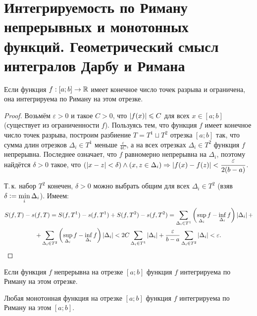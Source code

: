 \section{Интегрируемость по Риману непрерывных и монотонных функций. Геометрический смысл интегралов Дарбу и Римана}

\begin{statement}
    Если функция $f: [a; b] \to \mathbb{R}$ имеет конечное число точек разрыва и ограничена, она интегрируема по Риману на этом отрезке.
\end{statement}

\begin{proof}
    Возьмём $\varepsilon > 0$ и такое $C > 0$, что $\left\lvert f(x)\right\rvert \leqslant C$ для всех $x \in [a; b]$ (существует из ограниченности $f$). Пользуясь тем, что функция $f$ имеет конечное число точек разрыва, построим разбиение $T = T^1 \sqcup T^2$ отрезка $[a; b]$ так, что сумма длин отрезков $\Delta_i \in T^1$ меньше $\frac{\varepsilon}{4C}$, а на всех отрезках $\Delta_i \in T^2$ функция $f$ непрерывна. Последнее означает, что $f$ равномерно непрерывна на $\Delta_i$, поэтому найдётся $\delta > 0$ такое, что $\displaystyle\left(\left\lvert x - z\right\rvert < \delta\right) \wedge \left(x, z \in \Delta_i\right) \Rightarrow \left\lvert f(x) - f(z)\right\rvert < \frac{\varepsilon}{2(b - a)}$.

    Т.\,к. набор $T^2$ конечен, $\delta > 0$ можно выбрать общим для всех $\Delta_i \in T^2$ (взяв $\delta \vcentcolon = \min\limits_{i}\Delta_i$). Имеем:
    \begin{multline*}
        S(f, T) - s(f, T) = S(f, T^1) - s(f, T^1) + S(f, T^2) - s(f, T^2) = \sum_{\Delta_i \in T^1}\left(\sup_{\Delta_i}f - \inf\limits_{\Delta_i}f\right)\left\lvert\Delta_i\right\rvert +\\ + \sum_{\Delta_i \in T^2}\left(\sup_{\Delta_i}f - \inf_{\Delta_i}f\right)\left\lvert\Delta_i\right\rvert < 2C\sum_{\Delta_i \in T^1}\left\lvert\Delta_i\right\rvert + \frac{\varepsilon}{b - a}\sum_{\Delta_i \in T^2}\left\lvert\Delta_i\right\rvert < \varepsilon.
    \end{multline*}
\end{proof}

\begin{corollary}
    Если функция $f$ непрерывна на отрезке $[a; b]$ функция $f$ интегрируема по Риману на этом отрезке.
\end{corollary}

\begin{statement}
    Любая монотонная функция на отрезке $[a; b]$ функция $f$ интегрируема по Риману на этом $[a; b]$.
\end{statement}

